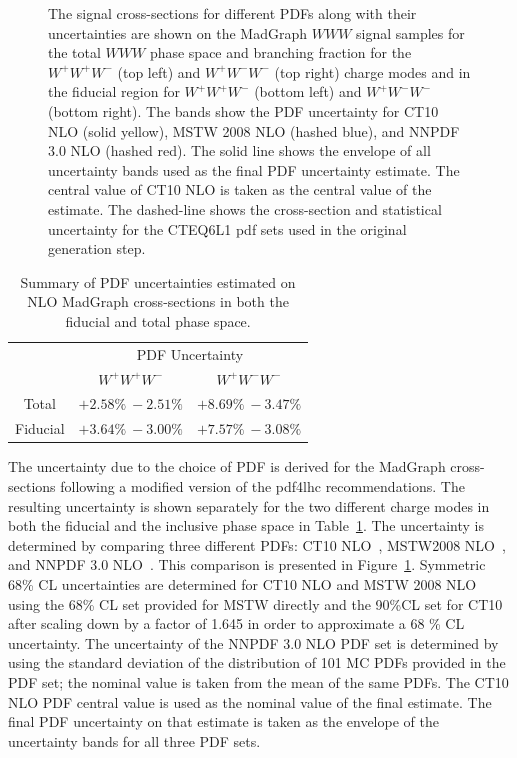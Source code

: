 \begin{figure}[ht!]
\caption{The signal cross-sections for different PDFs along with their
uncertainties are shown on the {\sc MadGraph} $WWW$ signal samples
for the total $WWW$ phase space and branching fraction for
the $W^{+}W^{+}W^{-}$ (top left) and $W^{+}W^{-}W^{-}$ (top right)
charge modes
and in the fiducial region for $W^{+}W^{+}W^{-}$ (bottom left) 
and $W^{+}W^{-}W^{-}$ (bottom right).
The bands show the PDF uncertainty for CT10 NLO (solid yellow),
MSTW 2008 NLO (hashed blue), and NNPDF 3.0 NLO (hashed red). The
solid line shows the envelope of all uncertainty bands used as the final
PDF uncertainty estimate. The central value of CT10 NLO is taken as the
central value of the estimate.
The dashed-line shows the cross-section and 
statistical uncertainty for the CTEQ6L1
pdf sets used in the original generation step.}
\label{fig:signal_pdf_unc}
\end{figure}

\begin{table}[ht!]
\centering
\begin{tabular}{c|c|c}
\hline
 & \multicolumn{2}{c}{PDF Uncertainty}\\
 & $W^{+}W^{+}W^{-}$ & $W^{+}W^{-}W^{-}$ \\
\hline
\hline
Total & $+2.58\%~-2.51\%$ &  $+8.69\%~-3.47\%$ \\
Fiducial & $+3.64\%~-3.00\%$ & $+7.57\%~-3.08\%$ \\
\hline
\end{tabular}
\caption{Summary of PDF uncertainties estimated on NLO {\sc MadGraph} cross-sections
in both the fiducial and total phase space.}
\label{tab:pdfunc}
\end{table}

The uncertainty due to the choice of PDF is derived for the {\sc MadGraph} 
cross-sections following a modified version of the pdf4lhc
\cite{Botje:2011sn} recommendations.  The resulting 
uncertainty is shown separately for the two different charge modes
in both the fiducial and the inclusive phase
space in Table~\ref{tab:pdfunc}.
The uncertainty is determined by comparing three different PDFs:
CT10 NLO~\cite{Lai:2010vv}, MSTW2008 NLO~\cite{Martin:2009iq}, 
and NNPDF 3.0 NLO~\cite{Ball:2014uwa}. 
This comparison is presented in Figure~\ref{fig:signal_pdf_unc}.  
Symmetric 68\% CL uncertainties 
are determined for CT10 NLO and MSTW 2008 NLO using the 68\% CL 
set provided for MSTW directly and the 90\%CL set for CT10 after
scaling down by 
a factor of 1.645 in order to approximate a 68 \% CL uncertainty. 
The uncertainty of the NNPDF 3.0 NLO PDF set is 
determined by using the standard deviation of the distribution 
of 101 MC PDFs provided in the PDF set; the nominal value is taken
from the mean of the same PDFs.  
The CT10 NLO PDF central value is used as the nominal 
value of the final estimate.
The final PDF uncertainty on that estimate is
taken as the envelope of the uncertainty bands for all three PDF sets.  



